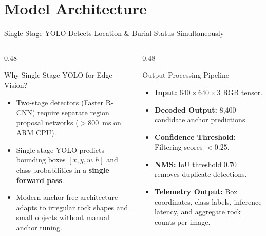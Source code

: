 \documentclass[aspectratio=169,10pt]{beamer}
\begin{document}
\section{Model Architecture}
\begin{frame}{Single-Stage YOLO Detects Location \& Burial Status Simultaneously}
\begin{columns}[T]
  \begin{column}{0.48\textwidth}
    \begin{block}{\small Why Single-Stage YOLO for Edge Vision?}
      \small
      \begin{itemize}
        \item Two-stage detectors (Faster R-CNN) require separate region proposal networks ($>800$~ms on ARM CPU).
        \item Single-stage YOLO predicts bounding boxes $[x, y, w, h]$ and class probabilities in a \textbf{single forward pass}.
        \item Modern anchor-free architecture adapts to irregular rock shapes and small objects without manual anchor tuning.
      \end{itemize}
    \end{block}
  \end{column}
  \begin{column}{0.48\textwidth}
    \begin{block}{\small Output Processing Pipeline}
      \small
      \begin{itemize}
        \item \textbf{Input:} $640\times640\times3$ RGB tensor.
        \item \textbf{Decoded Output:} 8,400 candidate anchor predictions.
        \item \textbf{Confidence Threshold:} Filtering scores $< 0.25$.
        \item \textbf{NMS:} IoU threshold $0.70$ removes duplicate detections.
        \item \textbf{Telemetry Output:} Box coordinates, class labels, inference latency, and aggregate rock counts per image.
      \end{itemize}
    \end{block}
  \end{column}
\end{columns}
\end{frame}

\end{document}
